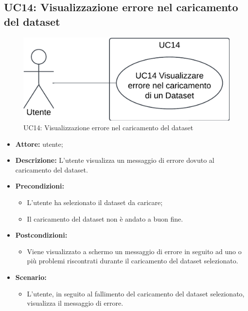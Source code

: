 \pagebreak

\subsection{UC14: Visualizzazione errore nel caricamento del dataset}
\begin{figure}[h!]\centering
    \includegraphics[scale=0.7]{template/images/UC14.png}
    \caption{UC14: Visualizzazione errore nel caricamento del dataset}
\end{figure}
\begin{itemize}    
    \item \textbf{Attore:} utente;
    \item \textbf{Descrizione:} L'utente visualizza un messaggio di errore dovuto al caricamento del dataset.
    \item \textbf{Precondizioni:}    
        \begin{itemize}
            \item L'utente ha selezionato il dataset da caricare;
            \item Il caricamento del dataset non è andato a buon fine.
        \end{itemize}    
    \item \textbf{Postcondizioni:}
        \begin{itemize}
            \item Viene visualizzato a schermo un messaggio di errore in seguito ad uno o più problemi riscontrati durante il caricamento del dataset selezionato.
        \end{itemize}    
    \item \textbf{Scenario:} 
        \begin{itemize}
            \item L'utente, in seguito al fallimento del caricamento del dataset selezionato, visualizza il messaggio di errore.
        \end{itemize}
\end{itemize}